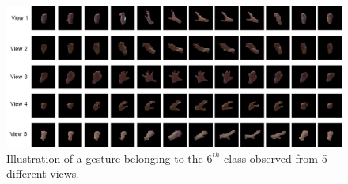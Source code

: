     \begin{figure}[htbp]
        \centering
        \includegraphics[width=0.9\linewidth]{figs/MICAGes2.png}
        \caption{Illustration of a gesture belonging to the $6^{th}$ class observed from 5 different views.}
        \label{Fig:MICAGes2}
    \end{figure}
